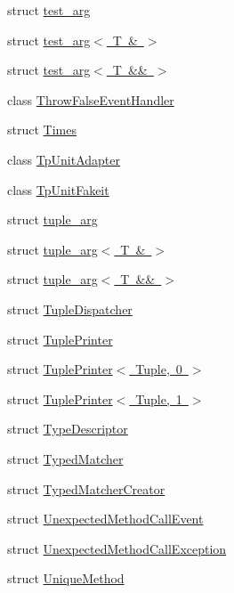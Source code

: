 \begin{DoxyCompactItemize}
\item 
struct \mbox{\hyperlink{structfakeit_1_1test__arg}{test\+\_\+arg}}
\item 
struct \mbox{\hyperlink{structfakeit_1_1test__arg_3_01T_01_6_01_4}{test\+\_\+arg$<$ T \& $>$}}
\item 
struct \mbox{\hyperlink{structfakeit_1_1test__arg_3_01T_01_6_6_01_4}{test\+\_\+arg$<$ T \&\& $>$}}
\item 
class \mbox{\hyperlink{classfakeit_1_1ThrowFalseEventHandler}{Throw\+False\+Event\+Handler}}
\item 
struct \mbox{\hyperlink{structfakeit_1_1Times}{Times}}
\item 
class \mbox{\hyperlink{classfakeit_1_1TpUnitAdapter}{Tp\+Unit\+Adapter}}
\item 
class \mbox{\hyperlink{classfakeit_1_1TpUnitFakeit}{Tp\+Unit\+Fakeit}}
\item 
struct \mbox{\hyperlink{structfakeit_1_1tuple__arg}{tuple\+\_\+arg}}
\item 
struct \mbox{\hyperlink{structfakeit_1_1tuple__arg_3_01T_01_6_01_4}{tuple\+\_\+arg$<$ T \& $>$}}
\item 
struct \mbox{\hyperlink{structfakeit_1_1tuple__arg_3_01T_01_6_6_01_4}{tuple\+\_\+arg$<$ T \&\& $>$}}
\item 
struct \mbox{\hyperlink{structfakeit_1_1TupleDispatcher}{Tuple\+Dispatcher}}
\item 
struct \mbox{\hyperlink{structfakeit_1_1TuplePrinter}{Tuple\+Printer}}
\item 
struct \mbox{\hyperlink{structfakeit_1_1TuplePrinter_3_01Tuple_00_010_01_4}{Tuple\+Printer$<$ Tuple, 0 $>$}}
\item 
struct \mbox{\hyperlink{structfakeit_1_1TuplePrinter_3_01Tuple_00_011_01_4}{Tuple\+Printer$<$ Tuple, 1 $>$}}
\item 
struct \mbox{\hyperlink{structfakeit_1_1TypeDescriptor}{Type\+Descriptor}}
\item 
struct \mbox{\hyperlink{structfakeit_1_1TypedMatcher}{Typed\+Matcher}}
\item 
struct \mbox{\hyperlink{structfakeit_1_1TypedMatcherCreator}{Typed\+Matcher\+Creator}}
\item 
struct \mbox{\hyperlink{structfakeit_1_1UnexpectedMethodCallEvent}{Unexpected\+Method\+Call\+Event}}
\item 
struct \mbox{\hyperlink{structfakeit_1_1UnexpectedMethodCallException}{Unexpected\+Method\+Call\+Exception}}
\item 
struct \mbox{\hyperlink{structfakeit_1_1UniqueMethod}{Unique\+Method}}

\end{DoxyCompactItemize}
